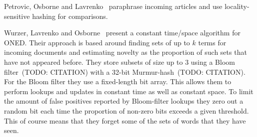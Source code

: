 Petrovic, Osborne and Lavrenko~\cite{petrovic2012using} paraphrase incoming articles and use locality-sensitive hashing for comparisons. 

Wurzer, Lavrenko and Osborne~\cite{wurzer2015kterm} present a constant time/space algorithm for ONED. Their approach is based around finding sets of up to $k$ terms for incoming documents and estimating novelty as the proportion of such sets that have not appeared before. They store subsets of size up to $3$ using a Bloom filter~(TODO: CITATION) with a 32-bit Murmur-hash~(TODO: CITATION). For the Bloom filter they use a fixed-length bit array. This allows them to perform lookups and updates in constant time as well as constant space. To limit the amount of false positives reported by Bloom-filter lookups they zero out a random bit each time the proportion of non-zero bits exceeds a given threshold. This of course means that they forget some of the sets of words that they have seen.
